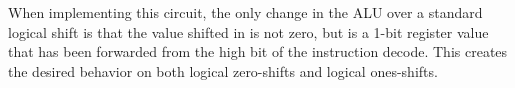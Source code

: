 When implementing this circuit, the only change in the ALU over a
standard logical shift is that the value shifted in is not zero, but is
a 1-bit register value that has been forwarded from the high bit of the
instruction decode. This creates the desired behavior on both logical
zero-shifts and logical ones-shifts.

%
%
%
%
%
%
%
%
%
%
%

